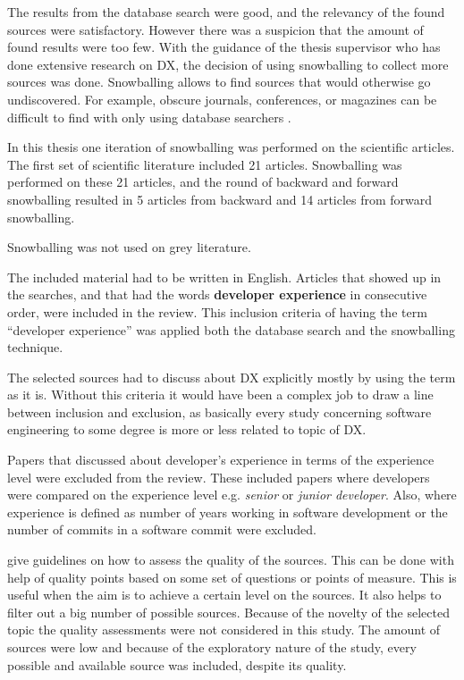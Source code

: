 \documentclass[english, 12pt, a4paper, sci, utf8, a-1b, online]{aaltothesis}
\newcounter{subsubsubsection}[subsubsection]
\begin{document}
The results from the database search were good, and the relevancy of the found sources were satisfactory. However there was a suspicion that the amount of found results were too few. With the guidance of the thesis supervisor who has done extensive research on DX, the decision of using snowballing to collect more sources was done. Snowballing allows to find sources that would otherwise go undiscovered. For example, obscure journals, conferences, or magazines can be difficult to find with only using database searchers \parencite{guidelines-for-snowballing}.

In this thesis one iteration of snowballing was performed on the scientific articles. The first set of scientific literature included 21 articles. Snowballing was performed on these 21 articles, and the round of backward and forward snowballing resulted in 5 articles from backward and 14 articles from forward snowballing.

Snowballing was not used on grey literature.


The included material had to be written in English. Articles that showed up in the searches, and that had the words \textbf{developer experience} in consecutive order, were included in the review. This inclusion criteria of having the term ``developer experience'' was applied both the database search and the snowballing technique.

The selected sources had to discuss about DX explicitly mostly by using the term as it is. Without this criteria it would have been a complex job to draw a line between inclusion and exclusion, as basically every study concerning software engineering to some degree is more or less related to topic of DX.


Papers that discussed about developer's experience in terms of the experience level were excluded from the review. These included papers where developers were compared on the experience level e.g. \textit{senior} or \textit{junior developer}. Also, where experience is defined as number of years working in software development or the number of commits in a software commit were excluded.


\textcite{guidelines-for-MLR} give guidelines on how to assess the quality of the sources. This can be done with help of quality points based on some set of questions or points of measure. This is useful when the aim is to achieve a certain level on the sources. It also helps to filter out a big number of possible sources. Because of the novelty of the selected topic the quality assessments were not considered in this study. The amount of sources were low and because of the exploratory nature of the study, every possible and available source was included, despite its quality.
\end{document}
